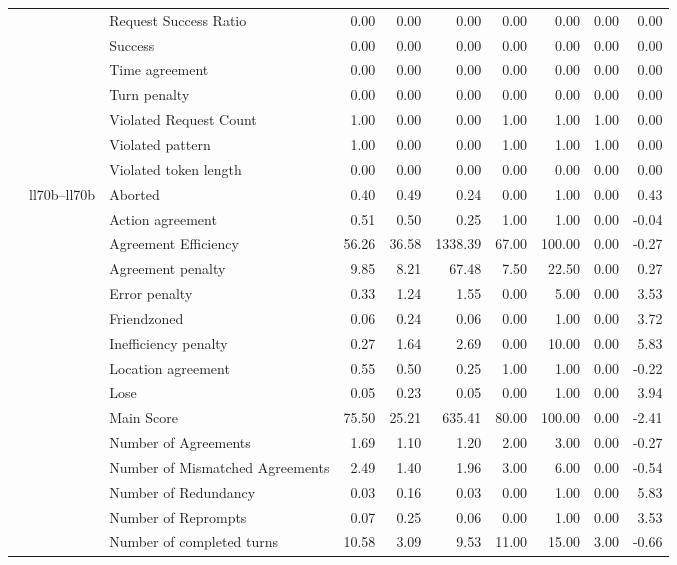 \begin{tabular}{lllrrrrrrr}
 &  & Request Success Ratio & 0.00 & 0.00 & 0.00 & 0.00 & 0.00 & 0.00 & 0.00 \\
 &  & Success & 0.00 & 0.00 & 0.00 & 0.00 & 0.00 & 0.00 & 0.00 \\
 &  & Time agreement & 0.00 & 0.00 & 0.00 & 0.00 & 0.00 & 0.00 & 0.00 \\
 &  & Turn penalty & 0.00 & 0.00 & 0.00 & 0.00 & 0.00 & 0.00 & 0.00 \\
 &  & Violated Request Count & 1.00 & 0.00 & 0.00 & 1.00 & 1.00 & 1.00 & 0.00 \\
 &  & Violated pattern & 1.00 & 0.00 & 0.00 & 1.00 & 1.00 & 1.00 & 0.00 \\
 &  & Violated token length & 0.00 & 0.00 & 0.00 & 0.00 & 0.00 & 0.00 & 0.00 \\
\cline{2-10}
 & \multirow[t]{27}{*}{ll70b--ll70b} & Aborted & 0.40 & 0.49 & 0.24 & 0.00 & 1.00 & 0.00 & 0.43 \\
 &  & Action agreement & 0.51 & 0.50 & 0.25 & 1.00 & 1.00 & 0.00 & -0.04 \\
 &  & Agreement Efficiency & 56.26 & 36.58 & 1338.39 & 67.00 & 100.00 & 0.00 & -0.27 \\
 &  & Agreement penalty & 9.85 & 8.21 & 67.48 & 7.50 & 22.50 & 0.00 & 0.27 \\
 &  & Error penalty & 0.33 & 1.24 & 1.55 & 0.00 & 5.00 & 0.00 & 3.53 \\
 &  & Friendzoned & 0.06 & 0.24 & 0.06 & 0.00 & 1.00 & 0.00 & 3.72 \\
 &  & Inefficiency penalty & 0.27 & 1.64 & 2.69 & 0.00 & 10.00 & 0.00 & 5.83 \\
 &  & Location agreement & 0.55 & 0.50 & 0.25 & 1.00 & 1.00 & 0.00 & -0.22 \\
 &  & Lose & 0.05 & 0.23 & 0.05 & 0.00 & 1.00 & 0.00 & 3.94 \\
 &  & Main Score & 75.50 & 25.21 & 635.41 & 80.00 & 100.00 & 0.00 & -2.41 \\
 &  & Number of Agreements & 1.69 & 1.10 & 1.20 & 2.00 & 3.00 & 0.00 & -0.27 \\
 &  & Number of Mismatched Agreements & 2.49 & 1.40 & 1.96 & 3.00 & 6.00 & 0.00 & -0.54 \\
 &  & Number of Redundancy & 0.03 & 0.16 & 0.03 & 0.00 & 1.00 & 0.00 & 5.83 \\
 &  & Number of Reprompts & 0.07 & 0.25 & 0.06 & 0.00 & 1.00 & 0.00 & 3.53 \\
 &  & Number of completed turns & 10.58 & 3.09 & 9.53 & 11.00 & 15.00 & 3.00 & -0.66 \\

\end{tabular}
